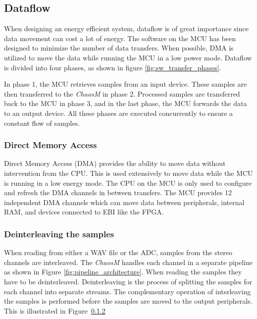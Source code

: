 
\subsection{Dataflow}

When designing an energy efficient system, dataflow is of great importance since
data movement can cost a lot of energy. The software on the MCU
has been designed to minimize the number of data transfers. When
possible, DMA is utilized to move the data while running the MCU in a low power
mode. Dataflow is divided into four phases, as shown in figure
\ref{fig:sw_transfer_phases}.

In phase 1, the MCU retrieves samples from an input device. These samples
are then transferred to the \textit{ChaosM} in phase 2. Processed samples are transferred back to the MCU in phase 3, and in the
last phase, the MCU forwards the data to an output device. All these
phases are executed concurrently to ensure a constant flow of samples.



\subsubsection{Direct Memory Access}

Direct Memory Access (DMA) provides the ability to move data without
intervention from the CPU. This is used extensively to move data while the
MCU is running in a low energy mode. The CPU on the MCU is only used to
configure and refresh the DMA channels in between transfers. The MCU provides 12
independent DMA channels which can move data between peripherals, internal RAM,
and devices connected to EBI like the FPGA.

% 

\subsubsection{Deinterleaving the samples}

When reading from either a WAV file or the ADC, samples from the stereo channels
are interleaved. The \textit{ChaosM} handles each channel in a separate pipeline as shown
in Figure \ref{fig:pipeline_architecture}. When reading the samples they have to be
deinterleaved. Deinterleaving is the process of splitting the samples for each
channel into separate streams. The complementary operation of interleaving the
samples is performed before the samples are moved to the output peripherals. This is
illustrated in Figure~\ref{}

